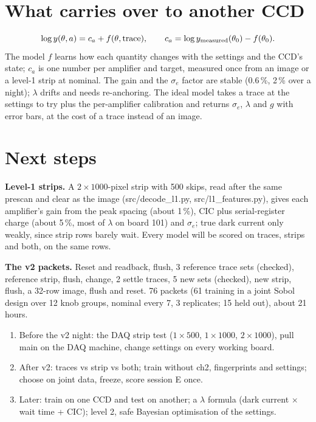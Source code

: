 \documentclass[11pt]{article}
\begin{document}
\section{What carries over to another CCD}

\begin{equation}
\log y(\theta,a)=c_a+f(\theta,\text{trace}),\qquad c_a=\log y_{\rm measured}(\theta_0)-f(\theta_0).
\end{equation}
The model $f$ learns how each quantity changes with the settings and the CCD's state; $c_a$ is one number per amplifier
and target, measured once from an image or a level-1 strip at nominal. The gain and the $\sigma_e$ factor are stable
(0.6\,\%, 2\,\% over a night); $\lambda$ drifts and needs re-anchoring. The ideal model takes a trace at the settings to
try plus the per-amplifier calibration and returns $\sigma_e$, $\lambda$ and $g$ with error bars, at the cost of a
trace instead of an image.

\section{Next steps}

\textbf{Level-1 strips.} A $2\times1000$-pixel strip with 500 skips, read after the same prescan and clear as the image
(src/decode\_l1.py, src/l1\_features.py), gives each amplifier's gain from the peak spacing (about 1\,\%), CIC plus
serial-register charge (about 5\,\%, most of $\lambda$ on board 101) and $\sigma_e$; true dark current only weakly,
since strip rows barely wait. Every model will be scored on traces, strips and both, on the same rows.

\textbf{The v2 packets.} Reset and readback, flush, 3 reference trace sets (checked), reference strip, flush, change,
2 settle traces, 5 new sets (checked), new strip, flush, a 32-row image, flush and reset. 76 packets (61 training in a
joint Sobol design over 12 knob groups, nominal every 7, 3 replicates; 15 held out), about 21 hours.

\begin{enumerate}
\item Before the v2 night: the DAQ strip test ($1\times500$, $1\times1000$, $2\times1000$), pull main on the DAQ
  machine, change settings on every working board.
\item After v2: traces vs strip vs both; train without ch2, fingerprints and settings; choose on joint data, freeze,
  score session E once.
\item Later: train on one CCD and test on another; a $\lambda$ formula (dark current $\times$ wait time + CIC); level 2,
  safe Bayesian optimisation of the settings.
\end{enumerate}
\end{document}

